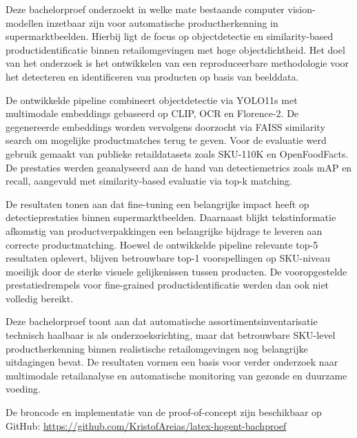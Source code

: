 Deze bachelorproef onderzoekt in welke mate bestaande computer vision-modellen inzetbaar zijn voor automatische productherkenning in supermarktbeelden. Hierbij ligt de focus op objectdetectie en similarity-based productidentificatie binnen retailomgevingen met hoge objectdichtheid. Het doel van het onderzoek is het ontwikkelen van een reproduceerbare methodologie voor het detecteren en identificeren van producten op basis van beelddata.

De ontwikkelde pipeline combineert objectdetectie via YOLO11s met multimodale embeddings gebaseerd op CLIP, OCR en Florence-2. De gegenereerde embeddings worden vervolgens doorzocht via FAISS similarity search om mogelijke productmatches terug te geven. Voor de evaluatie werd gebruik gemaakt van publieke retaildatasets zoals SKU-110K en OpenFoodFacts. De prestaties werden geanalyseerd aan de hand van detectiemetrics zoals mAP en recall, aangevuld met similarity-based evaluatie via top-k matching.

De resultaten tonen aan dat fine-tuning een belangrijke impact heeft op detectieprestaties binnen supermarktbeelden. Daarnaast blijkt tekstinformatie afkomstig van productverpakkingen een belangrijke bijdrage te leveren aan correcte productmatching. Hoewel de ontwikkelde pipeline relevante top-5 resultaten oplevert, blijven betrouwbare top-1 voorspellingen op SKU-niveau moeilijk door de sterke visuele gelijkenissen tussen producten. De vooropgestelde prestatiedrempels voor fine-grained productidentificatie werden dan ook niet volledig bereikt.

Deze bachelorproef toont aan dat automatische assortimentsinventarisatie technisch haalbaar is als onderzoeksrichting, maar dat betrouwbare SKU-level productherkenning binnen realistische retailomgevingen nog belangrijke uitdagingen bevat. De resultaten vormen een basis voor verder onderzoek naar multimodale retailanalyse en automatische monitoring van gezonde en duurzame voeding.

\vspace{0.5cm}

\noindent
De broncode en implementatie van de proof-of-concept zijn beschikbaar op GitHub:
\url{https://github.com/KristofAreias/latex-hogent-bachproef}
